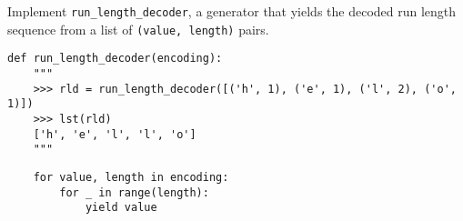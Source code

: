 \begin{blocksection}
\question Implement \lstinline$run_length_decoder$, a generator that yields the decoded
run length sequence from a list of \lstinline$(value, length)$ pairs.

\begin{lstlisting}
def run_length_decoder(encoding):
    """
    >>> rld = run_length_decoder([('h', 1), ('e', 1), ('l', 2), ('o', 1)])
    >>> lst(rld)
    ['h', 'e', 'l', 'l', 'o']
    """
\end{lstlisting}

\begin{solution}[1in]
\begin{lstlisting}
    for value, length in encoding:
        for _ in range(length):
            yield value
\end{lstlisting}
\end{solution}
\end{blocksection}
